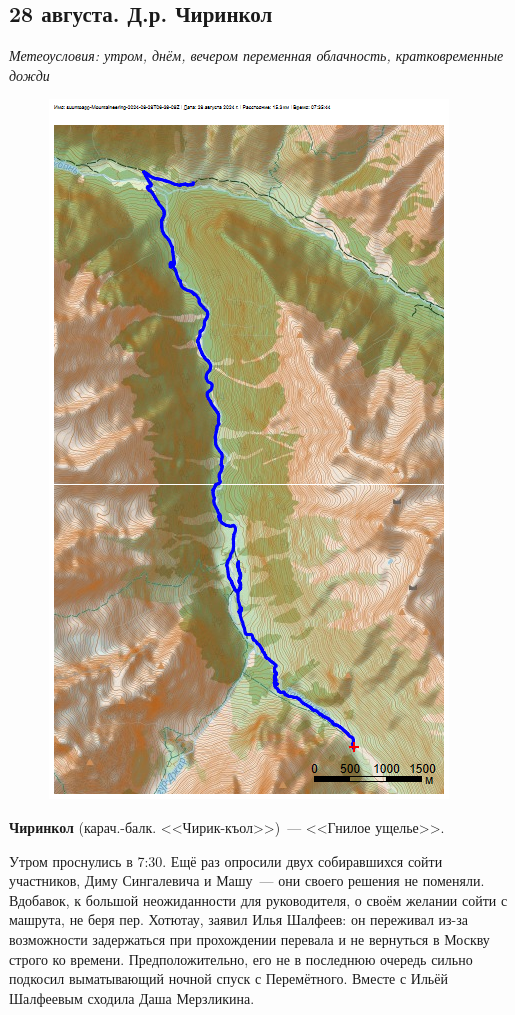 \subsection{28 августа. Д.р. Чиринкол}

\textit{Метеоусловия: утром, днём, вечером переменная облачность, кратковременные дожди}

\begin{figure}[h!]
	\centering
	\includegraphics[angle=0, width=0.7\linewidth]{../pics/mini_maps/28}
	\label{fig:mini_28}
\end{figure}

\textbf{Чиринкол} (карач.-балк. <<Чирик-къол>>)~--- <<Гнилое ущелье>>.

Утром проснулись в 7:30. Ещё раз опросили двух собиравшихся сойти участников, Диму Сингалевича и Машу~--- они своего решения не поменяли. Вдобавок, к большой неожиданности для руководителя, о своём желании сойти с машрута, не беря пер. Хотютау, заявил Илья Шалфеев: он переживал из-за возможности задержаться при прохождении перевала и не вернуться в Москву строго ко времени. Предположительно, его не в последнюю очередь сильно подкосил выматывающий ночной спуск с Перемётного. Вместе с Ильёй Шалфеевым сходила Даша Мерзликина.

